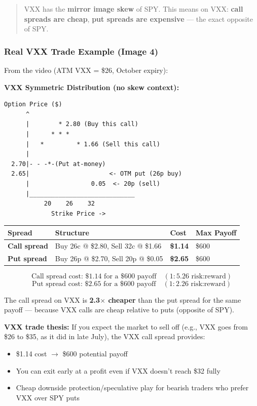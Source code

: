 \documentclass[12pt,openany]{book}
\begin{document}
\begin{quote}
VXX has the \textbf{mirror image skew} of SPY. This means on VXX: \textbf{call spreads are cheap}, \textbf{put spreads are expensive} — the exact opposite of SPY.
\end{quote}

\subsubsection{Real VXX Trade Example (Image 4)}

From the video (ATM VXX = \$26, October expiry):

\textbf{VXX Symmetric Distribution (no skew context):}

\begin{center}
\begin{Verbatim}[fontsize=\small,breaklines=true]
Option Price ($)
      ^
      |        * 2.80 (Buy this call)
      |      * * *
      |   *         * 1.66 (Sell this call)
      |                          
  2.70|- - -*-(Put at-money)
  2.65|                      <- OTM put (26p buy)
      |                 0.05  <- 20p (sell)
      |_____________________________
           20    26    32
             Strike Price ->
\end{Verbatim}
\end{center}

\begin{center}
\scriptsize
\setlength{\tabcolsep}{3pt}
\begin{tabular}{|L{3.0cm}|L{3.0cm}|L{3.0cm}|L{3.0cm}|}
\hline
\textbf{Spread} & \textbf{Structure} & \textbf{Cost} & \textbf{Max Payoff} \\
\hline
\textbf{Call spread} & Buy 26c @ \$2.80, Sell 32c @ \$1.66 & \textbf{\$1.14} & \$600 \\
\hline
\textbf{Put spread} & Buy 26p @ \$2.70, Sell 20p @ \$0.05 & \textbf{\$2.65} & \$600 \\
\hline
\end{tabular}
\end{center}

\[
\text{Call spread cost: \$1.14 for a \$600 payoff} \quad (1:5.26 \text{ risk:reward})
\]
\[
\text{Put spread cost: \$2.65 for a \$600 payoff} \quad (1:2.26 \text{ risk:reward})
\]

The call spread on VXX is \textbf{2.3\(\times\) cheaper} than the put spread for the same payoff — because VXX calls are cheap relative to puts (opposite of SPY).

\textbf{VXX trade thesis:} If you expect the market to sell off (e.g., VXX goes from \$26 to \$35, as it did in late July), the VXX call spread provides:
\begin{itemize}[leftmargin=*]
    \item \$1.14 cost \(\rightarrow\) \$600 potential payoff
    \item You can exit early at a profit even if VXX doesn't reach \$32 fully
    \item Cheap downside protection/speculative play for bearish traders who prefer VXX over SPY puts
\end{itemize}
\end{document}
